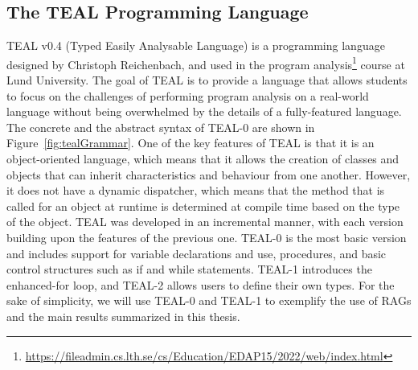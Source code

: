 \subsection{The TEAL Programming Language}
\label{sec:teal}
TEAL v0.4 (Typed Easily Analysable Language) is a programming language designed by Christoph Reichenbach, and  used in the
program analysis\footnote{\url{https://fileadmin.cs.lth.se/cs/Education/EDAP15/2022/web/index.html}} course at Lund University.
The goal of TEAL is to provide a language that allows students to
focus on the challenges of performing program analysis on a real-world language
without being overwhelmed by the details of a fully-featured language.
The concrete and the abstract syntax of TEAL-0 are shown in Figure~\ref{fig:tealGrammar}.
One of the key features of TEAL is that it is an object-oriented language,
which means that it allows the creation of classes and objects that can inherit
characteristics and behaviour from one another. However, it does not have a dynamic
dispatcher, which means that the method that is called for an object at runtime
is determined at compile time based on the type of the object.
TEAL was developed in an incremental manner, with each version building
upon the features of the previous one. TEAL-0 is the most basic version and includes
support for variable declarations and use, procedures, and basic control structures such as if
and while statements. TEAL-1 introduces the enhanced-for loop, and TEAL-2 allows users to
define their own types.
For the sake of simplicity, we will use TEAL-0 and TEAL-1 to exemplify the use of RAGs
and the main results summarized in this thesis.
\newsavebox{\mylistingbox}

